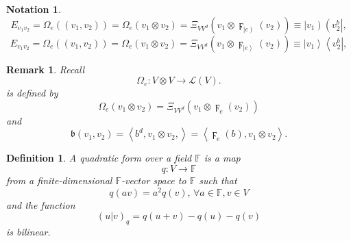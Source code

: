 \documentclass[aps,preprint]{revtex4}%
\newtheorem{definition}[theorem]{Definition}
\newtheorem{notation}[theorem]{Notation}
\newtheorem{remark}[theorem]{Remark}
\begin{document}
\begin{notation}%
\begin{equation}
E_{v_{1}v_{2}}=\Omega_{e}\left(  \left(  v_{1},v_{2}\right)  \right)
=\Omega_{e}\left(  v_{1}\otimes v_{2}\right)  =\Xi_{VV^{d}}\left(
v_{1}\otimes\digamma_{\left\vert e\right)  }\left(  v_{2}\right)  \right)
\equiv\left\vert v_{1}\right)  \left(  v_{2}^{b}\right\vert ,
\end{equation}%
\begin{equation}
E_{v_{1}v_{2}}=\Omega_{e}\left(  \left(  v_{1},v_{2}\right)  \right)
=\Omega_{e}\left(  v_{1}\otimes v_{2}\right)  =\Xi_{VV^{d}}\left(
v_{1}\otimes\digamma_{\left\vert e\right\rangle }\left(  v_{2}\right)
\right)  \equiv\left\vert v_{1}\right\rangle \left\langle v_{2}^{b}\right\vert
,
\end{equation}

\end{notation}

\begin{remark}
Recall
\begin{equation}
\Omega_{e}:V\otimes V\rightarrow\mathcal{L}\left(  V\right)  .
\end{equation}
is defined by%
\begin{equation}
\Omega_{e}\left(  v_{1}\otimes v_{2}\right)  =\Xi_{VV^{d}}\left(  v_{1}%
\otimes\digamma_{e}\left(  v_{2}\right)  \right)
\end{equation}
and
\begin{equation}
\mathfrak{b}\left(  v_{1},v_{2}\right)  =\left\langle b^{d},v_{1}\otimes
v_{2},\right\rangle =\left\langle \digamma_{e}\left(  b\right)  ,v_{1}\otimes
v_{2}\right\rangle .
\end{equation}

\end{remark}

\begin{definition}
A quadratic form over a field $\mathbb{F}$ is a map
\begin{equation}
q:V\rightarrow\mathbb{F}%
\end{equation}
from a finite-dimensional $\mathbb{F}$-vector space to $\mathbb{F}$ such that
\begin{equation}
q(av)=a^{2}q(v),\,\forall a\in\mathbb{F},v\in V
\end{equation}
and the function%
\begin{equation}
\left(  \left.  u\right\vert v\right)  _{q}=q(u+v)-q(u)-q(v)
\end{equation}
is bilinear.
\end{definition}
\end{document}
